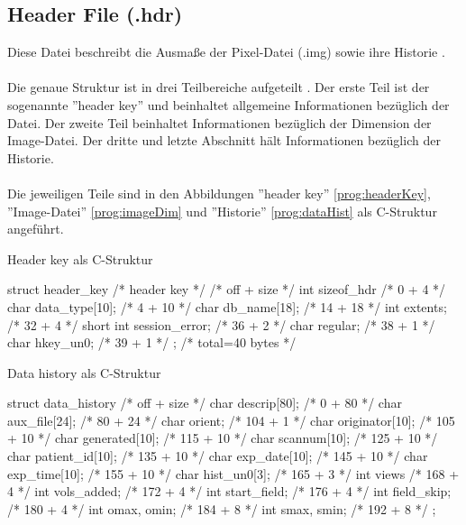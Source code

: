 \subsection{Header File (.hdr)}
\label{sec:DateiHead}
Diese Datei beschreibt die Ausmaße der Pixel-Datei (.img) sowie ihre Historie \citep{AnalyzeFormat}. \\\\
Die genaue Struktur ist in drei Teilbereiche aufgeteilt \citep{AnalyzeFormat}. Der erste Teil ist der sogenannte ''header key'' und beinhaltet allgemeine Informationen bezüglich der Datei. Der zweite Teil beinhaltet Informationen bezüglich der Dimension der Image-Datei. Der dritte und letzte Abschnitt hält Informationen bezüglich der Historie. \\
\\
Die jeweiligen Teile sind in den Abbildungen ''header key'' \ref{prog:headerKey}, ''Image-Datei'' \ref{prog:imageDim} und ''Historie'' \ref{prog:dataHist} als C-Struktur angeführt.

\begin{program}[H]
	\caption{Header key als C-Struktur \citep{AnalyzeFormat}}
	\label{prog:headerKey}
	\begin{CCode}
struct header_key /* header key */
{ /* off + size */
	int sizeof_hdr /* 0 + 4 */
	char data_type[10]; /* 4 + 10 */
	char db_name[18]; /* 14 + 18 */
	int extents; /* 32 + 4 */
	short int session_error; /* 36 + 2 */
	char regular; /* 38 + 1 */
	char hkey_un0; /* 39 + 1 */
}; /* total=40 bytes */ 
	\end{CCode}
\end{program}

\begin{program}
	\caption{Data history als C-Struktur \citep{AnalyzeFormat}}
	\label{prog:dataHist}
	\begin{CCode}
struct data_history
{ /* off + size */
	char descrip[80]; /* 0 + 80 */
	char aux_file[24]; /* 80 + 24 */
	char orient; /* 104 + 1 */
	char originator[10]; /* 105 + 10 */
	char generated[10]; /* 115 + 10 */
	char scannum[10]; /* 125 + 10 */
	char patient_id[10]; /* 135 + 10 */
	char exp_date[10]; /* 145 + 10 */
	char exp_time[10]; /* 155 + 10 */
	char hist_un0[3]; /* 165 + 3 */
	int views /* 168 + 4 */
	int vols_added; /* 172 + 4 */
	int start_field; /* 176 + 4 */
	int field_skip; /* 180 + 4 */
	int omax, omin; /* 184 + 8 */
	int smax, smin; /* 192 + 8 */
}; 
	\end{CCode}
\end{program}

